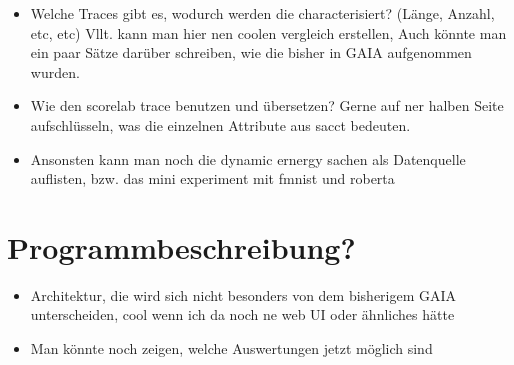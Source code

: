 \begin{itemize}
    \item Welche Traces gibt es, wodurch werden die characterisiert? (Länge, Anzahl, etc, etc) Vllt. kann man hier nen coolen vergleich erstellen, Auch könnte man ein paar Sätze darüber schreiben, wie die bisher in GAIA aufgenommen wurden.
    \item Wie den scorelab trace benutzen und übersetzen? Gerne auf ner halben Seite aufschlüsseln, was die einzelnen Attribute aus sacct bedeuten.
    \item Ansonsten kann man noch die dynamic ernergy sachen als Datenquelle auflisten, bzw. das mini experiment mit fmnist und roberta 
\end{itemize}

\section{Programmbeschreibung?}

\begin{itemize}
    \item Architektur, die wird sich nicht besonders von dem bisherigem GAIA unterscheiden, cool wenn ich da noch ne web UI oder ähnliches hätte
    \item Man könnte noch zeigen, welche Auswertungen jetzt möglich sind
\end{itemize}